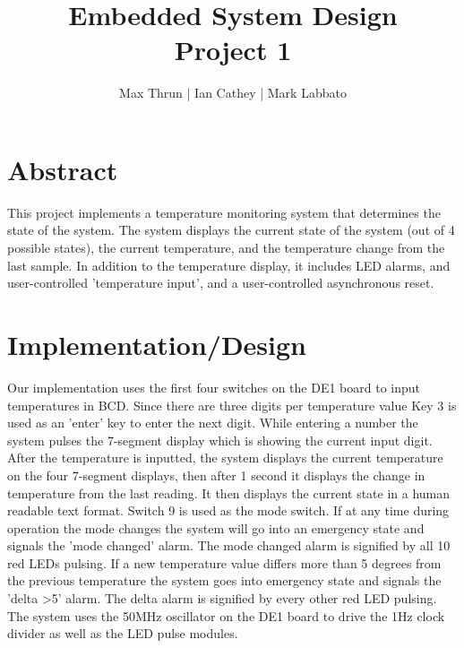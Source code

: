 \documentclass[12pt]{article}
\title{Embedded System Design \\ Project 1}
\author{ Max Thrun | Ian Cathey | Mark Labbato }
\begin{document}
\maketitle


\section*{Abstract}
This project implements a temperature monitoring system that determines the state of the system. The system displays the current state of the system (out of 4 possible states), the current temperature, and the temperature change from the last sample. In addition to the temperature display, it includes LED alarms, and user-controlled 'temperature input', and a user-controlled asynchronous reset.


\section*{Implementation/Design}
Our implementation uses the first four switches on the DE1 board to input temperatures in BCD. Since there are three digits per temperature value Key 3 is used as an 'enter' key to enter the next digit. While entering a number the system pulses the 7-segment display which is showing the current input digit.  After the temperature is inputted, the system displays the current temperature on the four 7-segment displays, then after 1 second it displays the change in temperature from the last reading. It then displays the current state in a human readable text format. Switch 9 is used as the mode switch. If at any time during operation the mode changes the system will go into an emergency state and signals the 'mode changed' alarm. The mode changed alarm is signified by all 10 red LEDs pulsing. If a new temperature value differs more than 5 degrees from the previous temperature the system goes into emergency state and signals the 'delta \textgreater  5' alarm. The delta alarm is signified by every other red LED pulsing. The system uses the 50MHz oscillator on the DE1 board to drive the 1Hz clock divider as well as the LED pulse modules.
\end{document}
